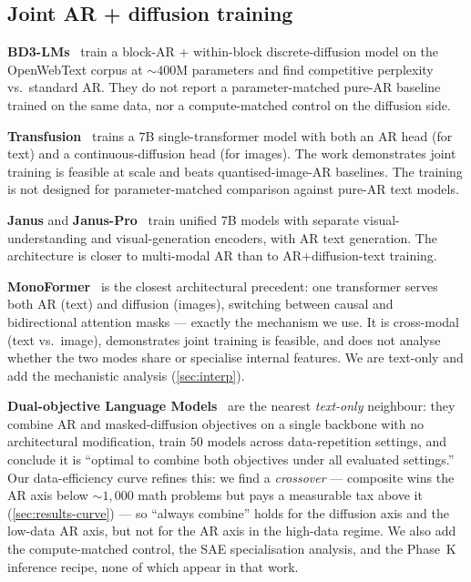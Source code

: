 \subsection{Joint AR + diffusion training}

\textbf{BD3-LMs}~\citep{nie2025bd3} train a block-AR + within-block
discrete-diffusion model on the OpenWebText corpus at $\sim 400$M
parameters and find competitive perplexity vs.\ standard AR. They do
not report a parameter-matched pure-AR baseline trained on the same
data, nor a compute-matched control on the diffusion side.

\textbf{Transfusion}~\citep{zhou2024transfusion} trains a $7$B
single-transformer model with both an AR head (for text) and a
continuous-diffusion head (for images). The work demonstrates joint
training is feasible at scale and beats quantised-image-AR baselines.
The training is not designed for parameter-matched comparison against
pure-AR text models.

\textbf{Janus} and \textbf{Janus-Pro}~\citep{wu2024janus,chen2025januspro}
train unified $7$B models with separate visual-understanding and
visual-generation encoders, with AR text generation. The architecture
is closer to multi-modal AR than to AR+diffusion-text training.

\textbf{MonoFormer}~\citep{zhao2024monoformer} is the closest
architectural precedent: one transformer serves both AR (text) and
diffusion (images), switching between causal and bidirectional
attention masks --- exactly the mechanism we use. It is cross-modal
(text vs.\ image), demonstrates joint training is feasible, and does
not analyse whether the two modes share or specialise internal
features. We are text-only and add the mechanistic analysis
(\textsection\ref{sec:interp}).

\textbf{Dual-objective Language Models}~\citep{samuel2025dualobjective}
are the nearest \emph{text-only} neighbour: they combine AR and
masked-diffusion objectives on a single backbone with no architectural
modification, train $50$ models across data-repetition settings, and
conclude it is ``optimal to combine both objectives under all
evaluated settings.'' Our data-efficiency curve refines this: we
find a \emph{crossover} --- composite wins the AR axis below
$\sim\!1{,}000$ math problems but pays a measurable tax above it
(\textsection\ref{sec:results-curve}) --- so ``always combine'' holds
for the diffusion axis and the low-data AR axis, but not for the
AR axis in the high-data regime. We also add the compute-matched
control, the SAE specialisation analysis, and the Phase~K inference
recipe, none of which appear in that work.

